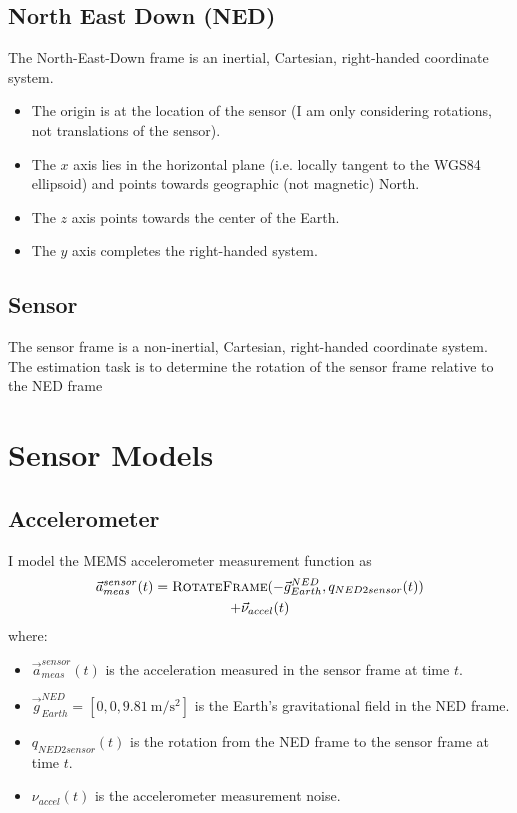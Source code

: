 \documentclass[conference]{IEEEtran}
\begin{document}
\subsection{North East Down (NED)}
The North-East-Down frame is an inertial, Cartesian, right-handed coordinate system.
\begin{itemize}
  \item The origin is at the location of the sensor (I am only considering rotations, not translations of the sensor).
  \item The $x$ axis lies in the horizontal plane (i.e. locally tangent to the WGS84 ellipsoid) and points towards geographic (not magnetic) North.
  \item The $z$ axis points towards the center of the Earth.
  \item The $y$ axis completes the right-handed system.
\end{itemize}

\subsection{Sensor}
The sensor frame is a non-inertial, Cartesian, right-handed coordinate system. The estimation task is to determine the rotation of the sensor frame relative to the NED frame

\section{Sensor Models}
\subsection{Accelerometer}
I model the MEMS accelerometer measurement function as
\begin{multline}
  \vec{a}_{meas}^{sensor}(t) = \textproc{RotateFrame}(-\vec{g}_{Earth}^{NED}, q_{NED2sensor}(t)) \\
  + \vec{\nu}_{accel}(t)
\end{multline}
where:
\begin{itemize}
  \item $\vec{a}_{meas}^{sensor}(t)$ is the acceleration measured in the sensor frame at time $t$.
  \item $\vec{g}_{Earth}^{NED} = [0, 0, \SI{9.81}{\meter\per\second\squared}]$ is the Earth's gravitational field in the NED frame.
  \item $q_{NED2sensor}(t)$ is the rotation from the NED frame to the sensor frame at time $t$.
  \item $\nu_{accel}(t)$ is the accelerometer measurement noise.
\end{itemize}
\end{document}
